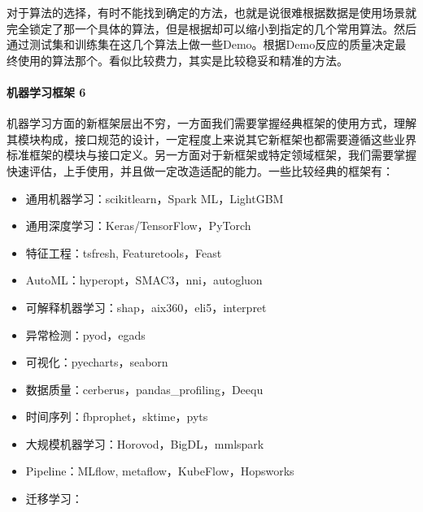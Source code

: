 \documentclass[letterpaper,11pt,english]{sphinxmanual}
\begin{document}
对于算法的选择，有时不能找到确定的方法，也就是说很难根据数据是使用场景就完全锁定了那一个具体的算法，但是根据却可以缩小到指定的几个常用算法。然后通过测试集和训练集在这几个算法上做一些Demo。根据Demo反应的质量决定最终使用的算法那个。看似比较费力，其实是比较稳妥和精准的方法。


\paragraph{机器学习框架 6\sphinxfootnotemark[834]}
\label{\detokenize{chapter_AI_dive/ML:id9}}%
\begin{footnotetext}[834]\sphinxAtStartFootnote
{}
%
\end{footnotetext}\ignorespaces 
机器学习方面的新框架层出不穷，一方面我们需要掌握经典框架的使用方式，理解其模块构成，接口规范的设计，一定程度上来说其它新框架也都需要遵循这些业界标准框架的模块与接口定义。另一方面对于新框架或特定领域框架，我们需要掌握快速评估，上手使用，并且做一定改造适配的能力。一些比较经典的框架有：
\begin{itemize}
\item {} 
通用机器学习：scikit\sphinxhyphen{}learn，Spark ML，LightGBM

\item {} 
通用深度学习：Keras/TensorFlow，PyTorch

\item {} 
特征工程：tsfresh, Featuretools，Feast

\item {} 
AutoML：hyperopt，SMAC3，nni，autogluon

\item {} 
可解释机器学习：shap，aix360，eli5，interpret

\item {} 
异常检测：pyod，egads

\item {} 
可视化：pyecharts，seaborn

\item {} 
数据质量：cerberus，pandas\_profiling，Deequ

\item {} 
时间序列：fbprophet，sktime，pyts

\item {} 
大规模机器学习：Horovod，BigDL，mmlspark

\item {} 
Pipeline：MLflow, metaflow，KubeFlow，Hopsworks

\item {} 
迁移学习：

\end{itemize}
\end{document}
